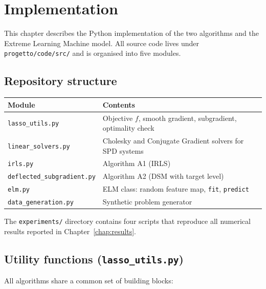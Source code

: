 \chapter{Implementation}
\label{chap:implementation}

This chapter describes the Python implementation of the two algorithms and
the Extreme Learning Machine model. All source code lives under
\texttt{progetto/code/src/} and is organised into five modules.

\section{Repository structure}
\label{sec:impl_structure}

\begin{center}
\begin{tabular}{ll}
\toprule
\textbf{Module} & \textbf{Contents} \\
\midrule
\texttt{lasso\_utils.py}          & Objective $f$, smooth gradient, subgradient, optimality check \\
\texttt{linear\_solvers.py}       & Cholesky and Conjugate Gradient solvers for SPD systems \\
\texttt{irls.py}                  & Algorithm A1 (IRLS) \\
\texttt{deflected\_subgradient.py}& Algorithm A2 (DSM with target level) \\
\texttt{elm.py}                   & ELM class: random feature map, \texttt{fit}, \texttt{predict} \\
\texttt{data\_generation.py}      & Synthetic problem generator \\
\bottomrule
\end{tabular}
\end{center}

The \texttt{experiments/} directory contains four scripts that reproduce all
numerical results reported in Chapter~\ref{chap:results}.

\section{Utility functions (\texttt{lasso\_utils.py})}
\label{sec:impl_utils}

All algorithms share a common set of building blocks:


